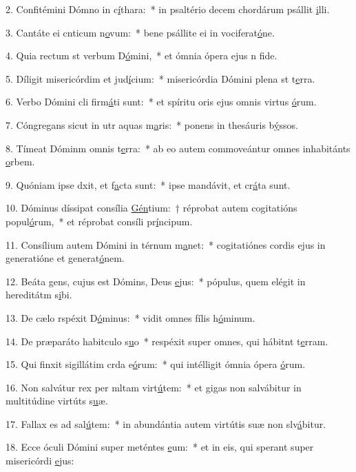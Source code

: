 2. Confitémini Dómno in c\uline{í}thara:~* in psaltério decem chordárum psállit \uline{i}lli.\par 
3. Cantáte ei cnticum n\uline{o}vum:~* bene psállite ei in vociferat\uline{ó}ne.\par 
4. Quia rectum st verbum D\uline{ó}mini,~* et ómnia ópera ejus n f\uline{i}de.\par 
5. Díligit misericórdim et jud\uline{í}cium:~* misericórdia Dómini plena st t\uline{e}rra.\par 
6. Verbo Dómini cli firm\uline{á}ti sunt:~* et spíritu oris ejus omnis virtus \uline{ó}rum.\par 
7. Cóngregans sicut in utr aquas m\uline{a}ris:~* ponens in thesáuris b\uline{ý}ssos.\par 
8. Tímeat Dóminm omnis t\uline{e}rra:~* ab eo autem commoveántur omnes inhabitánts \uline{o}rbem.\par 
9. Quóniam ipse dxit, et f\uline{a}cta sunt:~* ipse mandávit, et cr\uline{á}ta sunt.\par 
10. Dóminus díssipat consília \uline{Gén}tium:~† réprobat autem cogitatións popul\uline{ó}rum,~* et réprobat consíli pr\uline{í}ncipum.\par 
11. Consílium autem Dómini in térnum m\uline{a}net:~* cogitatiónes cordis ejus in generatióne et generat\uline{ó}nem.\par 
12. Beáta gens, cujus est Dómins, Deus \uline{e}jus:~* pópulus, quem elégit in hereditátm s\uline{i}bi.\par 
13. De cælo rspéxit D\uline{ó}minus:~* vidit omnes fílis h\uline{ó}minum.\par 
14. De præparáto habitculo s\uline{u}o~* respéxit super omnes, qui hábitnt t\uline{e}rram.\par 
15. Qui finxit sigillátim crda e\uline{ó}rum:~* qui intélligit ómnia ópera \uline{ó}rum.\par 
16. Non salvátur rex per mltam virt\uline{ú}tem:~* et gigas non salvábitur in multitúdine virtúts s\uline{u}æ.\par 
17. Fallax es ad sal\uline{ú}tem:~* in abundántia autem virtútis suæ non slv\uline{á}bitur.\par 
18. Ecce óculi Dómini super meténtes \uline{e}um:~* et in eis, qui sperant super misericórdi \uline{e}jus:\par 
